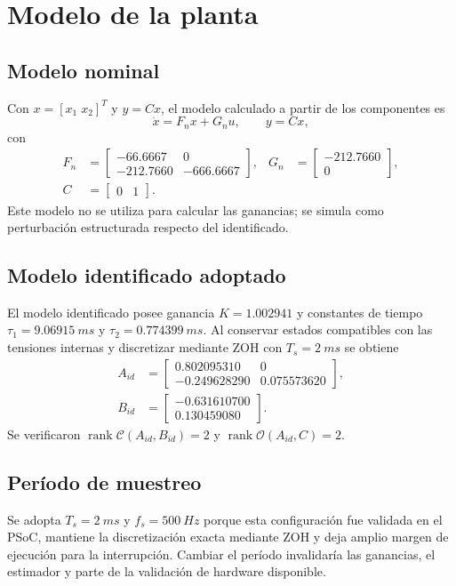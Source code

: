 \documentclass[conference]{IEEEtran}
\begin{document}
\section{Modelo de la planta}
\subsection{Modelo nominal}
Con $x=[x_1\;x_2]^T$ y $y=Cx$, el modelo calculado a partir de los componentes es
\begin{equation}
\dot{x}=F_{n}x+G_{n}u,\qquad y=Cx,
\end{equation}
con
\begin{align}
F_n&=\begin{bmatrix}-66.6667&0\\-212.7660&-666.6667\end{bmatrix},&
G_n&=\begin{bmatrix}-212.7660\\0\end{bmatrix},\\
C&=\begin{bmatrix}0&1\end{bmatrix}.
\end{align}
Este modelo no se utiliza para calcular las ganancias; se simula como perturbación estructurada respecto del identificado.

\subsection{Modelo identificado adoptado}
El modelo identificado posee ganancia $K=1.002941$ y constantes de tiempo $\tau_1=\SI{9.06915}{ms}$ y $\tau_2=\SI{0.774399}{ms}$. Al conservar estados compatibles con las tensiones internas y discretizar mediante ZOH con $T_s=\SI{2}{ms}$ se obtiene
\begin{align}
A_{id}&=\begin{bmatrix}
0.802095310&0\\
-0.249628290&0.075573620
\end{bmatrix},\\
B_{id}&=\begin{bmatrix}-0.631610700\\0.130459080\end{bmatrix}.
\end{align}
Se verificaron $\operatorname{rank}\mathcal{C}(A_{id},B_{id})=2$ y $\operatorname{rank}\mathcal{O}(A_{id},C)=2$.

\subsection{Período de muestreo}
Se adopta $T_s=\SI{2}{ms}$ y $f_s=\SI{500}{Hz}$ porque esta configuración fue validada en el PSoC, mantiene la discretización exacta mediante ZOH y deja amplio margen de ejecución para la interrupción. Cambiar el período invalidaría las ganancias, el estimador y parte de la validación de hardware disponible.
\end{document}
